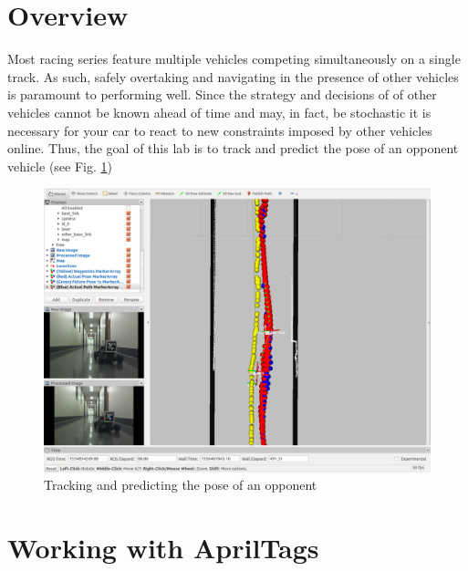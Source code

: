 \documentclass[letta4 paper]{article}
\numberwithin{equation}{section}
\newcommand{\0}{\mathbf{0}}
\begin{document}
	\section{Overview}
	Most racing series feature multiple vehicles competing simultaneously on a single track. As such, safely overtaking and navigating in the presence of other vehicles is paramount to performing well. Since the strategy and decisions of of other vehicles cannot be known ahead of time and may, in fact, be stochastic it is necessary for your car to react to new constraints imposed by other vehicles online.
	Thus, the goal of this lab is to track and predict the pose of an opponent vehicle (see Fig. \ref{fig:overview})
	\begin{figure}[h!b]
		\centering
		\includegraphics[width=\textwidth]{actual-versus-predicted-path-13.png}
		\caption{Tracking and predicting the pose of an opponent}
		\label{fig:overview}
	\end{figure}
	
	\section{Working with AprilTags}
\end{document}
